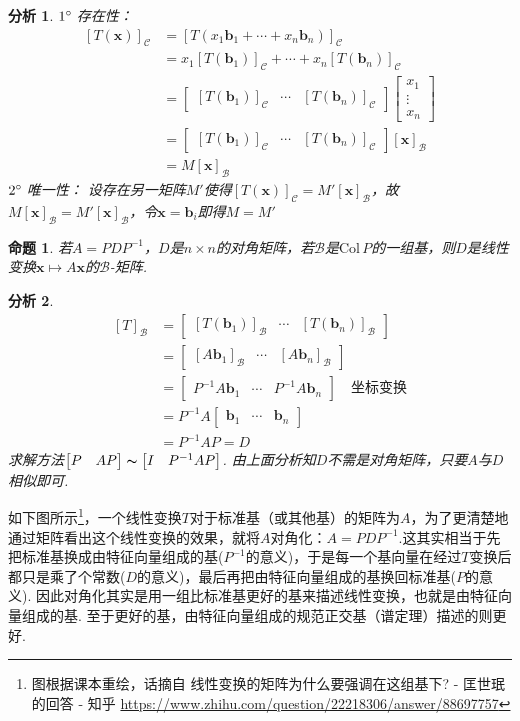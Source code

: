 \documentclass[11pt,UTF8]{ctexart}
\newtheorem{proposition}{命题}
\newtheorem*{analysis}{分析}
\def\vx{\mathbf{x}}
\def\col{\mathrm{Col}\,}
\newcommand{\vb}[1]{\mathbf{#1}}
\newcommand{\bmat}[2]{\begin{bmatrix}{#1}&\cdots&{#2}\end{bmatrix}}
\begin{document}
\begin{analysis}
$1\degree\;$存在性：
\[\begin{aligned} [T(\vx)]_{\mathcal{C}}&= [T(x_1\vb{b}_1+\cdots+x_n\vb{b}_n)]_{\mathcal{C}}\\
&= x_1[T(\vb{b}_1)]_{\mathcal{C}}+\cdots+x_n[T(\vb{b}_n)]_{\mathcal{C}}\\
&= \bmat{[T(\vb{b}_1)]_{\mathcal{C}}}{[T(\vb{b}_n)]_{\mathcal{C}}}\begin{bmatrix}x_1\\\vdots\\x_n\end{bmatrix}\\
&= \bmat{[T(\vb{b}_1)]_{\mathcal{C}}}{[T(\vb{b}_n)]_{\mathcal{C}}}[\vx]_{\mathcal{B}}\\
&= M[\vx]_{\mathcal{B}}
\end{aligned}\]
$2\degree\;$唯一性：
设存在另一矩阵$M'$使得$[T(\vx)]_{\mathcal{C}}=M'[\vx]_{\mathcal{B}}$，故$M[\vx]_{\mathcal{B}}=M'[\vx]_{\mathcal{B}}$，令$\vx=\vb{b}_i$即得$M=M'$
\end{analysis}
\begin{proposition}
若$A=PDP^{-1}$，$D$是$n\times n$的对角矩阵，若$\mathcal{B}$是$\col P$的一组基，则$D$是线性变换$\vx\mapsto A\vx$的$\mathcal{B}$-矩阵.
\end{proposition}
\begin{analysis}
\[\begin{aligned}
[T]_{\mathcal{B}}&=\bmat{[T(\mathbf{b}_1)]_\mathcal{B}}{[T(\mathbf{b}_n)]_\mathcal{B}}\\
&=\bmat{[A\vb{b}_1]_\mathcal{B}}{[A\vb{b}_n]_\mathcal{B}}\\
&=\bmat{P^{-1}A\vb{b}_1}{P^{-1}A\vb{b}_n}\quad\mbox{坐标变换}\\
&=P^{-1}A\bmat{\vb{b}_1}{\vb{b}_n}\\
&=P^{-1}AP=D
\end{aligned}\]
求解方法$\begin{bmatrix}P&AP\end{bmatrix}\thicksim\begin{bmatrix}I&P^{-1}AP\end{bmatrix}$. 由上面分析知$D$不需是对角矩阵，只要$A$与$D$相似即可.
\end{analysis}
\par 
如下图所示\footnote{图根据课本重绘，话摘自 线性变换的矩阵为什么要强调在这组基下? - 匡世珉的回答 - 知乎
\url{https://www.zhihu.com/question/22218306/answer/88697757}}，一个线性变换$T$对于标准基（或其他基）的矩阵为$A$，为了更清楚地通过矩阵看出这个线性变换的效果，就将$A$对角化：$A=PDP^{-1}$.这其实相当于先把标准基换成由特征向量组成的基($P^{-1}$的意义)，于是每一个基向量在经过$T$变换后都只是乘了个常数($D$的意义)，最后再把由特征向量组成的基换回标准基($P$的意义). 因此对角化其实是用一组比标准基更好的基来描述线性变换，也就是由特征向量组成的基. 至于更好的基，由特征向量组成的规范正交基（谱定理）描述的则更好.%
\end{document}
